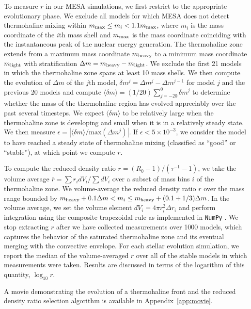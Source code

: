 To measure $r$ in our MESA simulations, we first restrict to the appropriate evolutionary phase. We exclude all models for which MESA does not detect thermohaline mixing within $m_{\rm max} \leq m_i < 1.1 m_{\rm max}$, where $m_i$ is the mass coordinate of the $i$th mass shell and $m_{\rm max}$ is the mass coordinate coinciding with the instantaneous peak of the nuclear energy generation.
The thermohaline zone extends from a maximum mass coordinate $m_{\rm heavy}$ to a minimum mass coordinate $m_{\rm light}$ with stratification $\Delta m = m_{\rm heavy} - m_{\rm light}$.
We exclude the first 21 models in which the thermohaline zone spans at least 10 mass shells.
We then compute the evolution of $\Delta m$ of the $j$th model, $\delta m^j = \Delta m^{j} - \Delta m^{j-1}$ for model $j$ and the previous 20 models and compute $\langle \delta m \rangle = (1/20)\sum_{j=-20}^0 \delta m^j$ to determine whether the mass of the thermohaline region has evolved appreciably over the past several timesteps. We expect $\langle \delta m \rangle$ to be relatively large when the thermohaline zone is developing and small when it is in a relatively steady state.
We then measure $\epsilon = |\langle \delta m \rangle / \mathrm{max}(\Delta m^j)|$. If $\epsilon < 5 \times 10^{-3}$, we consider the model to have reached a steady state of thermohaline mixing (classified as ``good'' or ``stable''), at which point we compute $r$.

To compute the reduced density ratio $r = (R_0 - 1)/(\tau^{-1} - 1)$, we take the volume average $\bar{r} = \sum r_i dV_i / \sum dV_i$ over a subset of mass bins $i$ of the thermohaline zone. We volume-average the reduced density ratio $r$ over the mass range bounded by $m_{\rm{heavy}} + 0.1\Delta m  < m_i \leq m_{\rm heavy} + (0.1 + 1/3)\Delta m$.
In the volume average, we set the volume element $dV_i = 4\pi r_i^2 \Delta r_i$ and perform integration using the composite trapezoidal rule as implemented in \texttt{NumPy} \citep{numpy}.
We stop extracting $r$ after we have collected measurements over 1000 models, which captures the behavior of the saturated thermohaline zone and its eventual merging with the convective envelope. For each stellar evolution simulation, we report the median of the volume-averaged $r$ over all of the stable models in which measurements were taken. Results are discussed in terms of the logarithm of this quantity, $\log_{10} r$.

A movie demonstrating the evolution of a thermohaline front and the reduced density ratio selection algorithm is available in Appendix~\ref{app:movie}.